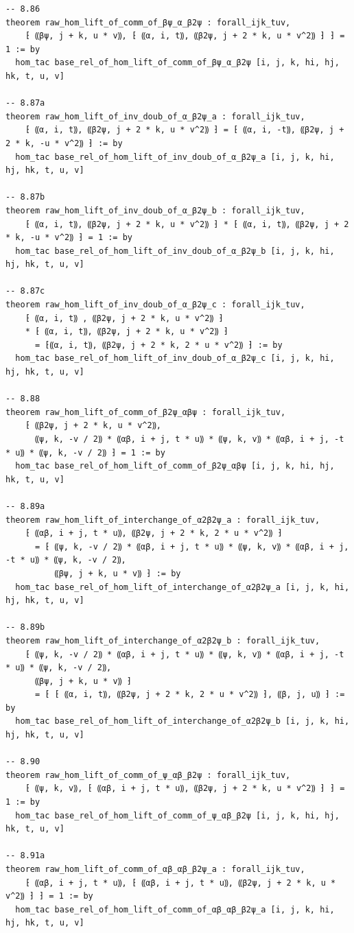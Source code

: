 \documentclass[10pt,a4paper]{article}
\begin{document}
\begin{Verbatim}
-- 8.86
theorem raw_hom_lift_of_comm_of_βψ_α_β2ψ : forall_ijk_tuv,
    ⁅ ⸨βψ, j + k, u * v⸩, ⁅ ⸨α, i, t⸩, ⸨β2ψ, j + 2 * k, u * v^2⸩ ⁆ ⁆ = 1 := by
  hom_tac base_rel_of_hom_lift_of_comm_of_βψ_α_β2ψ [i, j, k, hi, hj, hk, t, u, v]

-- 8.87a
theorem raw_hom_lift_of_inv_doub_of_α_β2ψ_a : forall_ijk_tuv,
    ⁅ ⸨α, i, t⸩, ⸨β2ψ, j + 2 * k, u * v^2⸩ ⁆ = ⁅ ⸨α, i, -t⸩, ⸨β2ψ, j + 2 * k, -u * v^2⸩ ⁆ := by
  hom_tac base_rel_of_hom_lift_of_inv_doub_of_α_β2ψ_a [i, j, k, hi, hj, hk, t, u, v]

-- 8.87b
theorem raw_hom_lift_of_inv_doub_of_α_β2ψ_b : forall_ijk_tuv,
    ⁅ ⸨α, i, t⸩, ⸨β2ψ, j + 2 * k, u * v^2⸩ ⁆ * ⁅ ⸨α, i, t⸩, ⸨β2ψ, j + 2 * k, -u * v^2⸩ ⁆ = 1 := by
  hom_tac base_rel_of_hom_lift_of_inv_doub_of_α_β2ψ_b [i, j, k, hi, hj, hk, t, u, v]

-- 8.87c
theorem raw_hom_lift_of_inv_doub_of_α_β2ψ_c : forall_ijk_tuv,
    ⁅ ⸨α, i, t⸩ , ⸨β2ψ, j + 2 * k, u * v^2⸩ ⁆
    * ⁅ ⸨α, i, t⸩, ⸨β2ψ, j + 2 * k, u * v^2⸩ ⁆
      = ⁅⸨α, i, t⸩, ⸨β2ψ, j + 2 * k, 2 * u * v^2⸩ ⁆ := by
  hom_tac base_rel_of_hom_lift_of_inv_doub_of_α_β2ψ_c [i, j, k, hi, hj, hk, t, u, v]

-- 8.88
theorem raw_hom_lift_of_comm_of_β2ψ_αβψ : forall_ijk_tuv,
    ⁅ ⸨β2ψ, j + 2 * k, u * v^2⸩,
      ⸨ψ, k, -v / 2⸩ * ⸨αβ, i + j, t * u⸩ * ⸨ψ, k, v⸩ * ⸨αβ, i + j, -t * u⸩ * ⸨ψ, k, -v / 2⸩ ⁆ = 1 := by
  hom_tac base_rel_of_hom_lift_of_comm_of_β2ψ_αβψ [i, j, k, hi, hj, hk, t, u, v]

-- 8.89a
theorem raw_hom_lift_of_interchange_of_α2β2ψ_a : forall_ijk_tuv,
    ⁅ ⸨αβ, i + j, t * u⸩, ⸨β2ψ, j + 2 * k, 2 * u * v^2⸩ ⁆
      = ⁅ ⸨ψ, k, -v / 2⸩ * ⸨αβ, i + j, t * u⸩ * ⸨ψ, k, v⸩ * ⸨αβ, i + j, -t * u⸩ * ⸨ψ, k, -v / 2⸩,
          ⸨βψ, j + k, u * v⸩ ⁆ := by
  hom_tac base_rel_of_hom_lift_of_interchange_of_α2β2ψ_a [i, j, k, hi, hj, hk, t, u, v]

-- 8.89b
theorem raw_hom_lift_of_interchange_of_α2β2ψ_b : forall_ijk_tuv,
    ⁅ ⸨ψ, k, -v / 2⸩ * ⸨αβ, i + j, t * u⸩ * ⸨ψ, k, v⸩ * ⸨αβ, i + j, -t * u⸩ * ⸨ψ, k, -v / 2⸩,
      ⸨βψ, j + k, u * v⸩ ⁆
      = ⁅ ⁅ ⸨α, i, t⸩, ⸨β2ψ, j + 2 * k, 2 * u * v^2⸩ ⁆, ⸨β, j, u⸩ ⁆ := by
  hom_tac base_rel_of_hom_lift_of_interchange_of_α2β2ψ_b [i, j, k, hi, hj, hk, t, u, v]

-- 8.90
theorem raw_hom_lift_of_comm_of_ψ_αβ_β2ψ : forall_ijk_tuv,
    ⁅ ⸨ψ, k, v⸩, ⁅ ⸨αβ, i + j, t * u⸩, ⸨β2ψ, j + 2 * k, u * v^2⸩ ⁆ ⁆ = 1 := by
  hom_tac base_rel_of_hom_lift_of_comm_of_ψ_αβ_β2ψ [i, j, k, hi, hj, hk, t, u, v]

-- 8.91a
theorem raw_hom_lift_of_comm_of_αβ_αβ_β2ψ_a : forall_ijk_tuv,
    ⁅ ⸨αβ, i + j, t * u⸩, ⁅ ⸨αβ, i + j, t * u⸩, ⸨β2ψ, j + 2 * k, u * v^2⸩ ⁆ ⁆ = 1 := by
  hom_tac base_rel_of_hom_lift_of_comm_of_αβ_αβ_β2ψ_a [i, j, k, hi, hj, hk, t, u, v]


\end{Verbatim}
\end{document}
